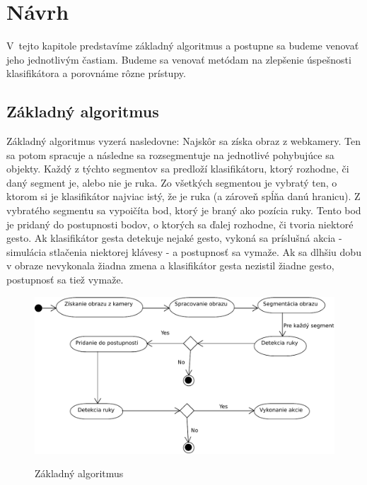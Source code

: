 
\chapter{Návrh}\label{chap:design}

V~tejto kapitole predstavíme základný algoritmus a postupne sa budeme venovať jeho jednotlivým častiam. Budeme sa venovať metódam na zlepšenie úspešnosti klasifikátora a porovnáme rôzne prístupy. 
\bigskip

\section{Základný algoritmus}

Základný algoritmus vyzerá nasledovne: 
Najskôr sa získa obraz z webkamery. Ten sa potom spracuje a následne sa rozsegmentuje na jednotlivé pohybujúce sa objekty.
Každý z týchto segmentov sa predloží klasifikátoru, ktorý rozhodne, či daný segment je, alebo nie je ruka. Zo všetkých segmentou je vybratý ten, o ktorom si je klasifikátor najviac istý, že je ruka (a zároveň spĺňa danú hranicu). Z vybratého segmentu sa vypoičíta bod, ktorý je braný ako pozícia ruky. Tento bod je pridaný do postupnosti bodov, o ktorých sa ďalej rozhodne, či tvoria niektoré gesto. Ak klasifikátor gesta detekuje nejaké gesto, vykoná sa príslušná akcia - simulácia stlačenia niektorej klávesy - a postupnosť sa vymaže. Ak sa dlhšiu dobu v obraze nevykonala žiadna zmena a klasifikátor gesta nezistil žiadne gesto, postupnosť sa tiež vymaže.

\begin{figure}[htp]
    \centering
    \includegraphics[width=\textwidth]{images/BaseAlgorithm}
    \label{fig:base_alg}
    \caption{Základný algoritmus}
\end{figure}

